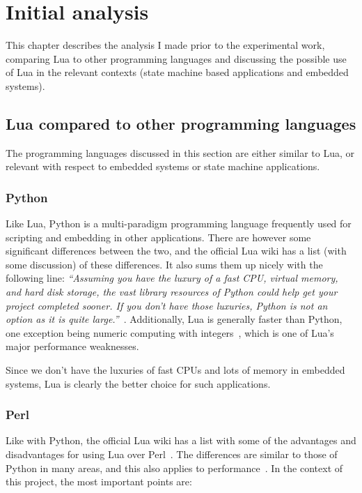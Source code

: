 \chapter{Initial analysis}
\label{ch:initial_analysis}
This chapter describes the analysis I made prior to the experimental work, comparing Lua to other programming languages and discussing the possible use of Lua in the relevant contexts (state machine based applications and embedded systems).

\section{Lua compared to other programming languages}
\label{sec:lua_compared}
The programming languages discussed in this section are either similar to Lua, or relevant with respect to embedded systems or state machine applications.

\subsection{Python}
\label{sec:lua_vs_python}
Like Lua, Python is a multi-paradigm programming language frequently used for scripting and embedding in other applications. There are however some significant differences between the two, and the official Lua wiki has a list (with some discussion) of these differences. It also sums them up nicely with the following line: \emph{``Assuming you have the luxury of a fast CPU, virtual memory, and hard disk storage, the vast library resources of Python could help get your project completed sooner. If you don't have those luxuries, Python is not an option as it is quite large.''}~\cite{website:lua_wiki_python}. Additionally, Lua is generally faster than Python, one exception being numeric computing with integers~\cite{website:lua_perl_python_vs}, which is one of Lua's major performance weaknesses.

Since we don't have the luxuries of fast CPUs and lots of memory in embedded systems, Lua is clearly the better choice for such applications.

\subsection{Perl}
\label{sec:lua_vs_perl}
Like with Python, the official Lua wiki has a list with some of the advantages and disadvantages for using Lua over Perl~\cite{website:lua_wiki_perl}. The differences are similar to those of Python in many areas, and this also applies to performance~\cite{website:lua_perl_python_vs}. In the context of this project, the most important points are:

